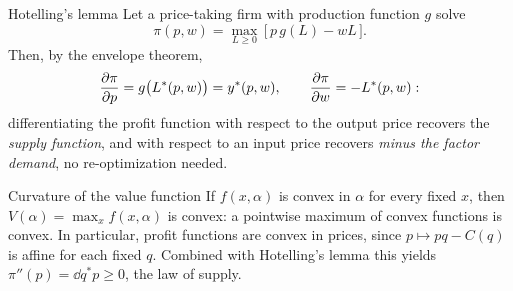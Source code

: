\begin{rulebox}{Hotelling's lemma}
Let a price-taking firm with production function $g$ solve
\[
  \pi(p,w)=\max_{L\ge0}\,\bigl[\,p\,g(L)-wL\,\bigr].
\]
Then, by the envelope theorem,
\[
  \frac{\partial \pi}{\partial p}=g\bigl(L^*(p,w)\bigr)=y^*(p,w), \qquad
  \frac{\partial \pi}{\partial w}=-L^*(p,w):
\]
differentiating the profit function with respect to the output price
recovers the \emph{supply function}, and with respect to an input price
recovers \emph{minus the factor demand}, no re-optimization needed.
\end{rulebox}

\begin{rulebox}{Curvature of the value function}
If $f(x,\alpha)$ is convex in $\alpha$ for every fixed $x$, then
$V(\alpha)=\max_x f(x,\alpha)$ is convex: a pointwise maximum of convex
functions is convex. In particular, profit functions are convex in
prices, since $p\mapsto pq-C(q)$ is affine for each fixed $q$. Combined
with Hotelling's lemma this yields $\pi''(p)=\dd{q^*}{p}\ge0$, the law
of supply.
\end{rulebox}

